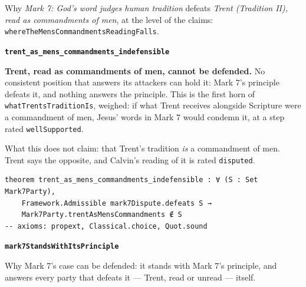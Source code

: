 \documentclass[11pt]{article}
\begin{document}
\noindent Why \emph{Mark 7: God's word judges human tradition} defeats \emph{Trent (Tradition II), read as commandments of men}, at the level of the claims: \texttt{where\allowbreak{}The\allowbreak{}Mens\allowbreak{}Commandments\allowbreak{}Reading\allowbreak{}Falls}.
\par\medskip\noindent\textbf{\texttt{trent\_\allowbreak{}as\_\allowbreak{}mens\_\allowbreak{}commandments\_\allowbreak{}indefensible}}\par\nobreak\noindent
\textbf{Trent, read as commandments of men, cannot be defended.} No consistent position that answers its attackers can hold it: Mark 7's principle defeats it, and nothing answers the principle. This is the first horn of \texttt{what\allowbreak{}Trents\allowbreak{}Tradition\allowbreak{}Is}, weighed: if what Trent receives alongside Scripture were a commandment of men, Jesus' words in Mark 7 would condemn it, at a step rated \texttt{well\allowbreak{}Supported}.

What this does not claim: that Trent's tradition \emph{is} a commandment of men. Trent says the opposite, and Calvin's reading of it is rated \texttt{disputed}.

{\small\begin{verbatim}
theorem trent_as_mens_commandments_indefensible : ∀ (S : Set Mark7Party),
    Framework.Admissible mark7Dispute.defeats S →
    Mark7Party.trentAsMensCommandments ∉ S
-- axioms: propext, Classical.choice, Quot.sound
\end{verbatim}}
\par\medskip\noindent\textbf{\texttt{mark7\allowbreak{}Stands\allowbreak{}With\allowbreak{}Its\allowbreak{}Principle}}\par\nobreak\noindent
Why Mark 7's case can be defended: it stands with Mark 7's principle, and answers every party that defeats it — Trent, read or unread — itself.
\end{document}
